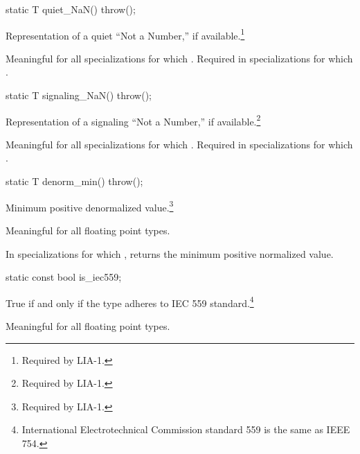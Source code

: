 \begin{itemdecl}
static T quiet_NaN() throw();
\end{itemdecl}

\begin{itemdescr}
\pnum
Representation of a quiet ``Not a Number,'' if available.\footnote{Required by LIA-1.}

\pnum
Meaningful for all specializations for which
.
Required in specializations for which
.
\end{itemdescr}

\begin{itemdecl}
static T signaling_NaN() throw();
\end{itemdecl}

\begin{itemdescr}
\pnum
Representation of a signaling ``Not a Number,'' if available.\footnote{Required by LIA-1.}

\pnum
Meaningful for all specializations for which
.
Required in specializations for which
.
\end{itemdescr}

\begin{itemdecl}
static T denorm_min() throw();
\end{itemdecl}

\begin{itemdescr}
\pnum
Minimum positive denormalized value.\footnote{Required by LIA-1.}

\pnum
Meaningful for all floating point types.

\pnum
In specializations for which
,
returns the minimum positive normalized value.
\end{itemdescr}

\begin{itemdecl}
static const bool is_iec559;
\end{itemdecl}

\begin{itemdescr}
\pnum
True if and only if the type adheres to IEC 559 standard.\footnote{International
Electrotechnical Commission standard 559 is the same as
IEEE 754.}

\pnum
Meaningful for all floating point types.
\end{itemdescr}

